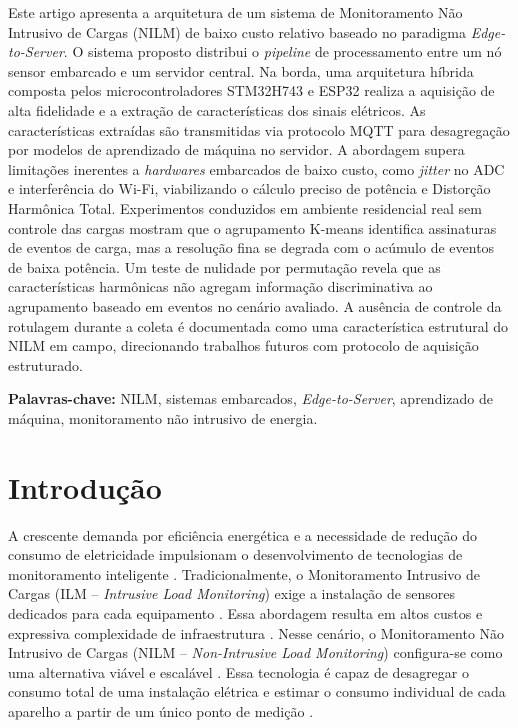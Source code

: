 \documentclass[12pt]{article}
\begin{document}
\begin{resumo}
  Este artigo apresenta a arquitetura de um sistema de Monitoramento N\~ao
  Intrusivo de Cargas (NILM) de baixo custo relativo baseado no paradigma
  \textit{Edge-to-Server}. O sistema proposto distribui o \textit{pipeline} de
  processamento entre um n\'o sensor embarcado e um servidor central. Na borda,
  uma arquitetura h\'ibrida composta pelos microcontroladores STM32H743 e ESP32
  realiza a aquisi\c{c}\~ao de alta fidelidade e a extra\c{c}\~ao de
  caracter\'isticas dos sinais el\'etricos. As caracter\'isticas extra\'idas
  s\~ao transmitidas via protocolo MQTT para desagrega\c{c}\~ao por modelos de
  aprendizado de m\'aquina no servidor. A abordagem supera limita\c{c}\~oes
  inerentes a \textit{hardwares} embarcados de baixo custo, como \textit{jitter}
  no ADC e interfer\^encia do Wi-Fi, viabilizando o c\'alculo preciso de
  pot\^encia e Distor\c{c}\~ao Harm\^onica Total.
  Experimentos conduzidos em ambiente residencial real sem controle das cargas
  mostram que o agrupamento K-means identifica assinaturas de eventos de carga,
  mas a resolu\c{c}\~ao fina se degrada com o ac\'umulo de eventos de baixa
  pot\^encia. Um teste de nulidade por permuta\c{c}\~ao revela que as
  caracter\'isticas harm\^onicas n\~ao agregam informa\c{c}\~ao discriminativa
  ao agrupamento baseado em eventos no cen\'ario avaliado. A aus\^encia de
  controle da rotulagem durante a coleta \'e documentada como uma
  caracter\'istica estrutural do NILM em campo, direcionando trabalhos futuros
  com protocolo de aquisi\c{c}\~ao estruturado.

  \textbf{Palavras-chave:} NILM, sistemas embarcados, \textit{Edge-to-Server},
  aprendizado de m\'aquina, monitoramento n\~ao intrusivo de energia.
\end{resumo}


\section{Introdu\c{c}\~ao}

A crescente demanda por efici\^encia energ\'etica e a necessidade de redu\c{c}\~ao
do consumo de eletricidade impulsionam o desenvolvimento de tecnologias de
monitoramento inteligente \citep{ref2,ref6}. Tradicionalmente, o Monitoramento
Intrusivo de Cargas (ILM -- \textit{Intrusive Load Monitoring}) exige a
instala\c{c}\~ao de sensores dedicados para cada equipamento \citep{ref1,ref2}.
Essa abordagem resulta em altos custos e expressiva complexidade de
infraestrutura \citep{ref2,ref3}. Nesse cen\'ario, o Monitoramento N\~ao Intrusivo de
Cargas (NILM -- \textit{Non-Intrusive Load Monitoring}) configura-se como uma
alternativa vi\'avel e escal\'avel \citep{ref1,ref6}. Essa tecnologia \'e capaz de
desagregar o consumo total de uma instala\c{c}\~ao el\'etrica e estimar o consumo
individual de cada aparelho a partir de um \'unico ponto de medi\c{c}\~ao
\citep{ref1}.
\end{document}
